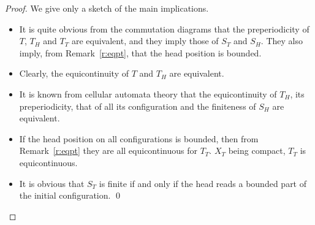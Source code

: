 \documentclass{llncs}
\begin{document}
\begin{proof}We give only a sketch of the main implications.
\begin{itemize}
 \item It is quite obvious from the commutation diagrams that the preperiodicity of $T$, $T_H$ and $T_T$ are equivalent, and they imply those of $S_T$ and $S_H$.
They also imply, from Remark~\ref{r:eqpt}, that the head position is bounded.
 \item Clearly, the equicontinuity of $T$ and $T_H$ are equivalent.
 \item It is known from cellular automata theory that the equicontinuity of $T_H$, its preperiodicity, that of all its configuration and the finiteness of $S_H$ are equivalent.
 \item If the head position on all configurations is bounded, then from Remark~\ref{r:eqpt} they are all equicontinuous for $T_T$. $X_T$ being compact, $T_T$ is equicontinuous.
 \item It is obvious that $S_T$ is finite if and only if the head reads a bounded part of the initial configuration.
\qed
\end{itemize}
\end{proof}
\end{document}
